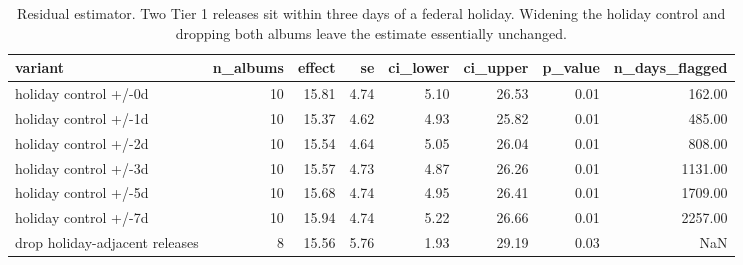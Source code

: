 \begin{table}
\caption{Residual estimator. Two Tier 1 releases sit within three days of a federal holiday. Widening the holiday control and dropping both albums leave the estimate essentially unchanged.}
\begin{tabular}{lrrrrrrr}
\toprule
variant & n\_albums & effect & se & ci\_lower & ci\_upper & p\_value & n\_days\_flagged \\
\midrule
holiday control +/-0d & 10 & 15.81 & 4.74 & 5.10 & 26.53 & 0.01 & 162.00 \\
holiday control +/-1d & 10 & 15.37 & 4.62 & 4.93 & 25.82 & 0.01 & 485.00 \\
holiday control +/-2d & 10 & 15.54 & 4.64 & 5.05 & 26.04 & 0.01 & 808.00 \\
holiday control +/-3d & 10 & 15.57 & 4.73 & 4.87 & 26.26 & 0.01 & 1131.00 \\
holiday control +/-5d & 10 & 15.68 & 4.74 & 4.95 & 26.41 & 0.01 & 1709.00 \\
holiday control +/-7d & 10 & 15.94 & 4.74 & 5.22 & 26.66 & 0.01 & 2257.00 \\
drop holiday-adjacent releases & 8 & 15.56 & 5.76 & 1.93 & 29.19 & 0.03 & NaN \\
\bottomrule
\end{tabular}
\end{table}
